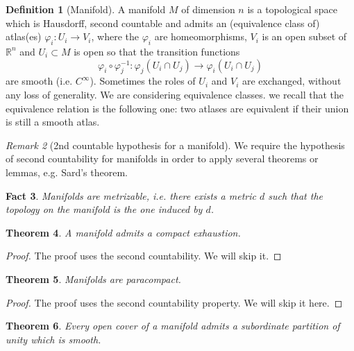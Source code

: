 \documentclass[a4paper,11pt,titlepage, article, oneside]{memoir}
\numberwithin{equation}{section}
\newtheorem{theorem}{Theorem}[section]
\newtheorem{fact}[theorem]{Fact}
\theoremstyle{definition}
\newtheorem{definition}[theorem]{Definition}
\theoremstyle{remark}
\newtheorem{remark}[theorem]{Remark}
\newcommand{\rfield}{\mathbb{R}}
\begin{document}
\begin{definition}[Manifold]
A manifold $M$ of dimension $n$ is a topological space which is Hausdorff, second countable and admits an (equivalence class of) atlas(es) $\varphi_i \colon U_i \rightarrow V_i$, where the 
$\varphi_i$ are homeomorphisms, $V_i$ is an open subset of $\rfield^n$ and $U_i \subset M$ is open so that the transition functions
$$\varphi_i \circ \varphi_j^{-1} \colon \varphi_j(U_i \cap U_j) \rightarrow \varphi_i (U_i \cap U_j)$$ are smooth (i.e. $C^{\infty}$). Sometimes the roles of $U_i$ and $V_i$ are exchanged, without any loss of generality. We are considering equivalence classes. we recall that the equivalence relation is the following one: two atlases are equivalent if their union is still a smooth atlas.
\end{definition}

\begin{remarkbox} \begin{remark}[2nd countable hypothesis for a manifold]
We require the hypothesis of second countability for manifolds in order to apply several theorems or lemmas, e.g. Sard's theorem.
\end{remark} \end{remarkbox}

\begin{fact}
Manifolds are metrizable, i.e. there exists a metric $d$ such that the topology on the manifold is the one induced by $d$.
\end{fact}


\begin{theorem}
A manifold admits a compact exhaustion.
\end{theorem}
\begin{proof}
The proof uses the second countability. We will skip it.
\end{proof}


\begin{theorem} \label{paracompactnessthm}
Manifolds are paracompact.
\end{theorem}
\begin{proof}
The proof uses the second countability property. We will skip it here.
\end{proof}



\begin{theorem}
Every open cover of a manifold admits a subordinate partition of unity which is smooth.
\end{theorem}
\end{document}
